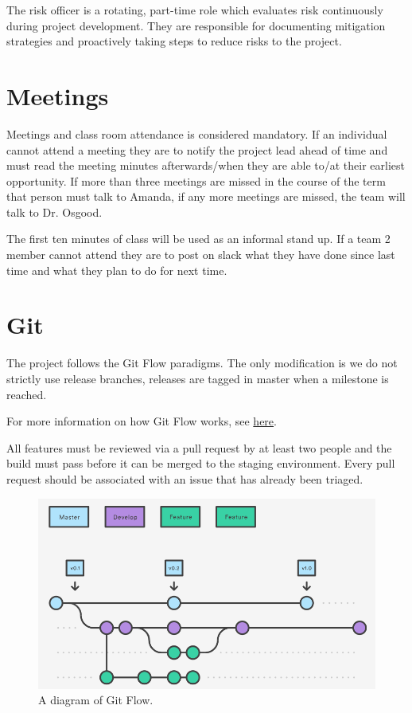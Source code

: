 \documentclass{scrreprt}
\begin{document}
The risk officer is a rotating, part-time role which evaluates
risk continuously during project development. They are responsible
for documenting mitigation strategies and proactively taking
steps to reduce risks to the project. 

\section{Meetings}

Meetings and class room attendance is considered mandatory. 
If an individual cannot attend a meeting they are to notify the project lead ahead of time and must read the meeting minutes afterwards/when they are able to/at their earliest opportunity. If more than three meetings are missed in the course of the term that person must talk to Amanda, if any more meetings are missed, the team will talk to Dr. Osgood.

The first ten minutes of class will be used as an informal stand up.
If a team 2 member cannot attend they are to post on slack what they have done since last time and what they plan to do for next time. 

\section{Git}

The project follows the Git Flow paradigms. The only
modification is we do not strictly use release branches, releases
are tagged in master when a milestone is reached. 

For more information on how Git Flow works, see \href{https://www.atlassian.com/git/tutorials/comparing-workflows/gitflow-workflow}{here}.

All features must be reviewed via a pull request by at least two
people and the build must pass before it can be merged to the staging
environment. Every pull request should be associated with an issue that
has already been triaged.

\begin{figure}[H]
    \includegraphics[width=\linewidth]{gitflow}
    \caption{A diagram of Git Flow.}
    \label{fig:gitflow}
\end{figure}
\end{document}
